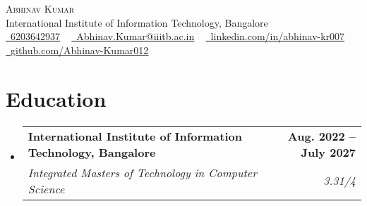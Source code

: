 \documentclass[letterpaper,11pt]{article}
\makeatletter
\newcommand{\resumeSubheading}[4]{
  \vspace{-2pt}\item
    \begin{tabular*}{1.0\textwidth}[t]{l@{\extracolsep{\fill}}r}
      \textbf{#1} & \textbf{\small #2} \\
      \textit{\small#3} & \textit{\small #4} \\
    \end{tabular*}\vspace{-7pt}
}
\newcommand{\resumeSubHeadingListStart}{\begin{itemize}[leftmargin=0.0in, label={}]}
\newcommand{\resumeSubHeadingListEnd}{\end{itemize}}
\makeatother
\begin{document}

\begin{center}
    {\Huge \scshape Abhinav Kumar} \\ \vspace{1pt}
    International Institute of Information Technology, Bangalore \\ \vspace{1pt}
    \small \href{tel:+916203642937}{\raisebox{-0.1\height}\faPhone\ 6203642937} ~ 
    \href{mailto:Abhinav.Kumar@iiitb.ac.in}{\raisebox{-0.2\height}\faEnvelope\  \underline{Abhinav.Kumar@iiitb.ac.in}} ~
    \href{https://www.linkedin.com/in/abhinav-kr007/}{\raisebox{-0.2\height}\faLinkedin\ \underline{linkedin.com/in/abhinav-kr007}} ~ 
    \href{https://github.com/Abhinav-Kumar012}{\raisebox{-0.2\height}\faGithub\ \underline{github.com/Abhinav-Kumar012}} 
    \vspace{-8pt}
\end{center}


\section{Education}
  \resumeSubHeadingListStart
    \resumeSubheading
      {International Institute of Information Technology, Bangalore}{Aug. 2022 -- July 2027}
      {Integrated Masters of Technology in Computer Science}{3.31/4}
  \resumeSubHeadingListEnd



\end{document}
